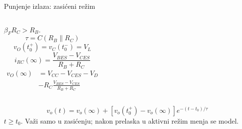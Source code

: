 \begin{frame}[label=10-s064]{Punjenje izlaza: zasićeni režim}
\setlength{\abovedisplayskip}{4pt}\setlength{\belowdisplayskip}{4pt}\setlength{\abovedisplayshortskip}{3pt}\setlength{\belowdisplayshortskip}{3pt}
\begin{columns}[T,onlytextwidth]\centering{}\centering{}\centering \raggedright
$\beta_FR_C>R_B$.
\[\tau=C(R_B\parallel R_C)\]
\[v_O(t_0^+)=v_C(t_0^-)=V_L\]
\[i_{RC}(\infty)=\frac{V_{BES}-V_{CES}}{R_B+R_C}\]
\[\begin{aligned}v_O(\infty)&=V_{CC}-V_{CES}-V_D\\&-R_C\frac{V_{BES}-V_{CES}}{R_B+R_C}\end{aligned}\]\end{columns}\vspace{1pt}
\[v_o(t)=v_o(\infty)+[v_o(t_0^+)-v_o(\infty)]e^{-(t-t_0)/\tau}\]\centering $t\geq t_0$.
\centering\textcolor{DEcrvena}{Važi samo u zasićenju; nakon prelaska u aktivni režim menja se model.}
\end{frame}
